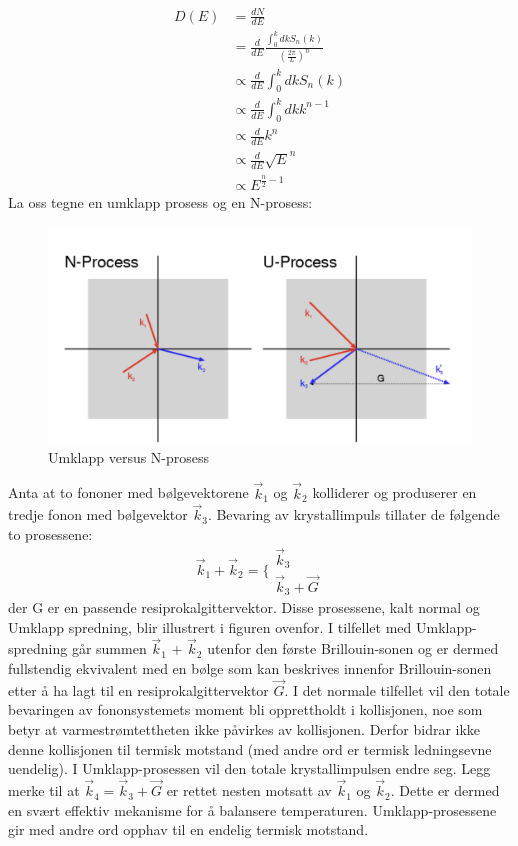 \documentclass{article}
\begin{document}
\begin{align}
    D(E) &= \frac{dN}{dE} \\
    &= \frac{d}{dE}\frac{\int_0^k dk S_n(k)}{\left(\frac{2\pi}{L}\right)^n} \\
    &\propto \frac{d}{dE} \int_0^k dk S_n(k) \\
    &\propto \frac{d}{dE} \int_0^k dk k^{n-1} \\
    &\propto \frac{d}{dE} k^n \\
    &\propto \frac{d}{dE} \sqrt{E}^n \\
    &\propto E^{\frac{n}{2}-1}
\end{align}
La oss tegne en umklapp prosess og en N-prosess:
\begin{figure}[H]
    \centering
    \includegraphics[width=0.5\linewidth]{bilder_lf/umklapp_versus_n_prosess.png}
    \caption{Umklapp versus N-prosess}
    \label{fig:umklapp_versus_n_prosess}
\end{figure}
Anta at to fononer med bølgevektorene $\vec{k}_1$ og $\vec{k}_2$ kolliderer og produserer en tredje fonon med bølgevektor $\vec{k}_3$. Bevaring av krystallimpuls tillater de følgende to prosessene:
\begin{equation}
    \vec{k}_1 + \vec{k}_2 = \Bigg\{ \begin{array}{c} \vec{k}_3 \\ \vec{k}_3 + \vec{G}
    \end{array}
\end{equation}
der G er en passende resiprokalgittervektor. Disse prosessene, kalt normal og Umklapp spredning, blir illustrert i figuren ovenfor. I tilfellet med Umklapp-spredning går summen $\vec{k}_1$ + $\vec{k}_2$ utenfor den første Brillouin-sonen og er dermed fullstendig ekvivalent med en bølge som kan beskrives innenfor Brillouin-sonen etter å ha lagt til en resiprokalgittervektor $\vec{G}$. I det normale tilfellet vil den totale bevaringen av fononsystemets moment bli opprettholdt i kollisjonen, noe som betyr at varmestrømtettheten ikke påvirkes av kollisjonen. Derfor bidrar ikke denne kollisjonen til termisk motstand (med andre ord er termisk ledningsevne uendelig). I Umklapp-prosessen vil den totale krystallimpulsen endre seg. Legg merke til at $\vec{k}_4 = \vec{k}_3+\vec{G}$ er rettet nesten motsatt av $\vec{k}_1$ og $\vec{k}_2$. Dette er dermed en svært effektiv mekanisme for å balansere temperaturen. Umklapp-prosessene gir med andre ord opphav til en endelig termisk motstand.
\end{document}
